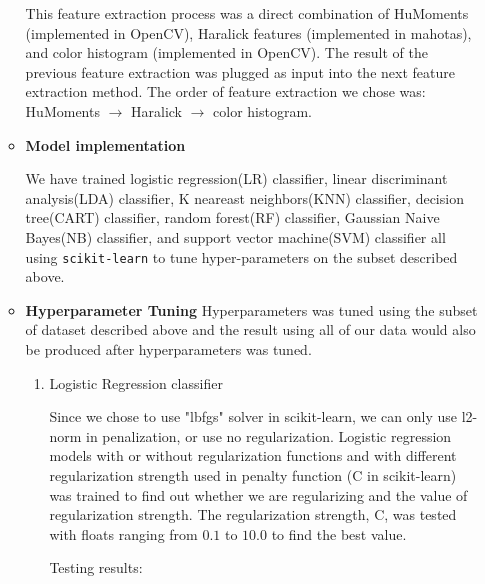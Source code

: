 \documentclass[11.5pt]{article}
\begin{document}
\begin{enumerate}
\begin{itemize}
            This feature extraction process was a direct combination of HuMoments (implemented in OpenCV), Haralick features (implemented in mahotas), and color histogram (implemented in OpenCV).
            The result of the previous feature extraction was plugged as input into the next feature extraction method.
            The order of feature extraction we chose was: HuMoments $\rightarrow$ Haralick $\rightarrow$ color histogram.
            \item \textbf{Model implementation}

            We have trained logistic regression(LR) classifier, linear discriminant analysis(LDA) classifier, K neareast neighbors(KNN) classifier, decision tree(CART) classifier, random forest(RF) classifier, Gaussian Naive Bayes(NB) classifier, and support vector machine(SVM) classifier all using \texttt{scikit-learn}\cite{scikit-learn} to tune hyper-parameters on the subset described above.
            \item \textbf{Hyperparameter Tuning}
            Hyperparameters was tuned using the subset of dataset described above and the result using all of our data would also be produced after hyperparameters was tuned.
            \begin{enumerate}
                \item Logistic Regression classifier

                Since we chose to use "lbfgs" solver in scikit-learn, we can only use l2-norm in penalization, or use no regularization.
                Logistic regression models with or without regularization functions and with different regularization strength used in penalty function (C in scikit-learn) was trained to find out whether we are regularizing and the value of regularization strength.
                The regularization strength, C, was tested with floats ranging from $0.1$ to $10.0$ to find the best value.

                Testing results:


\end{enumerate}
\end{itemize}
\end{enumerate}
\end{document}
